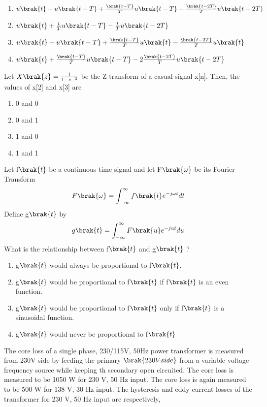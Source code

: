 \begin{enumerate}
    \item $u\brak{t} - u\brak{t-T} + \frac{\brak{t-T}}{T}u\brak{t-T} - \frac{\brak{t-2T}}{T}u\brak{t-2T}$
    \item $u\brak{t} + \frac{t}{T}u\brak{t-T} - \frac{t}{T}u\brak{t-2T}$
    \item $u\brak{t} - u\brak{t-T} + \frac{\brak{t-T}}{T}u\brak{t}- \frac{\brak{t-2T}}{T}u\brak{t}$
    \item $u\brak{t} + \frac{\brak{t-T}}{T}u\brak{t-T} - 2\frac{\brak{t-2T}}{T}u\brak{t-2T}$
\end{enumerate}
\item Let $ X\brak{z} = \frac{1}{1 - z^{-3}}$ be the Z-transform of a casual signal x[n]. Then, the values of x[2] and x[3] are
\begin{enumerate}
    \item 0 and 0
    \item 0 and 1
    \item 1 and 0
    \item 1 and 1
\end{enumerate}
\item Let f$\brak{t}$ be a continuous time signal and let F$\brak{\omega}$ be its Fourier Transform $$F\brak{\omega}=\int_{-\infty}^{\infty} f\brak{t}e^{-j\omega t} dt$$
Define g$\brak{t}$ by $$g\brak{t} = \int_{-\infty}^{\infty} F\brak{u}e^{-jut} du$$
What is the relationship between f$\brak{t}$
and g$\brak{t}$ ?
\begin{enumerate}
    \item g$\brak{t}$ would always be proportional to f$\brak{t}$.
    \item g$\brak{t}$ would be proportional to f$\brak{t}$ if f$\brak{t}$ is an even function.
    \item g$\brak{t}$ would be proportional to f$\brak{t}$ only if f$\brak{t}$ is a sinusoidal function.
    \item g$\brak{t}$ would never be proportional to f$\brak{t}$
\end{enumerate}
\item The core loss of a single phase, 230/115V, 50Hz power transformer is measured from 230V side by feeding the primary $\brak{230 V side}$ from a variable voltage frequency source while keeping th secondary open circuited. The core loss is measured to be 1050 W for 230 V, 50 Hz input. The core loss is again measured to be 500 W for 138 V, 30 Hz input. The hysteresis and eddy current losses of the transformer for 230 V, 50 Hz input are respectively,
